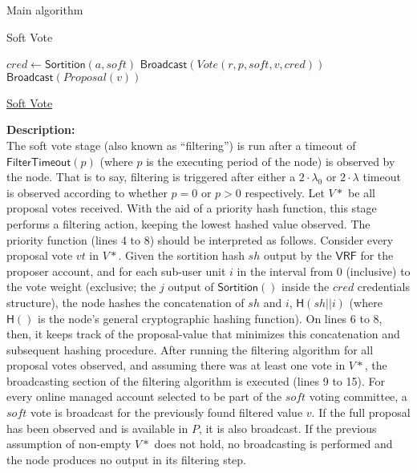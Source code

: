 \documentclass[10pt,a4paper]{article}
\begin{document}
\begin{section}{Main algorithm}
\begin{subsection}{Soft Vote}
\begin{algorithm}[H]
\begin{algorithmic}[1]
            \State $cred \gets \mathsf{Sortition}(a, soft)$
                \State $\mathsf{Broadcast}(Vote(r, p, soft, v, cred))$
                    \State $\mathsf{Broadcast}(Proposal(v))$
                \EndIf
            \EndIf
        \EndFor
    \EndIf

    \EndFunction
    \end{algorithmic}
    \caption{\underline{Soft Vote}}
\end{algorithm}

\noindent \textbf{Description:}\\
The soft vote stage (also known as ``filtering'') is run after a timeout of $\mathsf{FilterTimeout}(p)$
(where $p$ is the executing period of the node) is observed by the node. 
That is to say, filtering is triggered after either a $2\cdot\lambda_0$ or $2\cdot\lambda$ timeout is observed according 
to whether $p=0$ or $p>0$ respectively.
Let $V*$ be all proposal votes received. 
With the aid of a priority hash function, this stage performs a filtering action,
keeping the lowest hashed value observed.
The priority function (lines 4 to 8) should be interpreted as follows. Consider every proposal vote $vt$ in $V*$.
Given the sortition hash $sh$ output by the $\mathsf{VRF}$ for the proposer account, and for each sub-user unit $i$ 
in the interval from $0$ (inclusive) to the vote weight (exclusive; the $j$ output of $\mathsf{Sortition}()$ inside 
the $cred$ credentials structure), the node hashes the concatenation of $sh$ and $i$, $\mathsf{H}(sh||i)$ 
(where $\mathsf{H}()$ is the node's general cryptographic hashing function). On lines 6 to 8, 
then, it keeps track of the proposal-value that minimizes this concatenation and subsequent hashing procedure.
After running the filtering algorithm for all proposal votes observed, and assuming there was at least one vote
in $V*$, the broadcasting section of the filtering algorithm is executed (lines 9 to 15).
For every online managed account selected to be part of the $soft$ voting committee, a $soft$ vote is
broadcast for the previously found filtered value $v$. If the full proposal has been observed and is available in $P$,
it is also broadcast. 
If the previous assumption of non-empty $V*$ does not hold, no broadcasting is performed and the node produces no
output in its filtering step.

\end{subsection}


\end{section}
\end{document}
